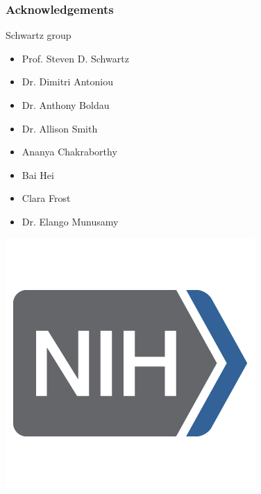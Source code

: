 \documentclass{beamer}
\begin{document}
\begin{frame}
\frametitle{Acknowledgements}
\begin{block}{Schwartz group}
\begin{itemize}
    \item Prof. Steven D. Schwartz
    \item Dr. Dimitri Antoniou
    \item Dr. Anthony Boldau
    \item Dr. Allison Smith
    \item Ananya Chakraborthy
    \item Bai Hei
    \item Clara Frost
    \item Dr. Elango Munusamy
\end{itemize}
\end{block}
\pause
\includegraphics[scale=0.1]{figures/nih-logo.png}
\end{frame}
%
%
%
%
\end{document}

